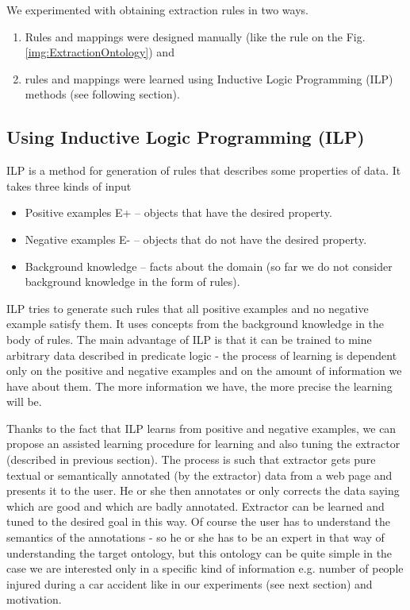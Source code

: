 \documentclass{sig-alternate}
\begin{document}
We experimented with obtaining extraction rules in two ways.
\begin{enumerate}
\item Rules and mappings were designed manually (like the rule on the Fig. \ref{img:ExtractionOntology}) and 
\item rules and mappings were learned using Inductive Logic Programming (ILP) methods (see following section).
\end{enumerate}


\subsection{Using Inductive Logic Programming (ILP)}
ILP is a method for generation of rules that describes some properties of data. It takes three kinds of input
\begin{itemize}
	\item Positive examples E+ -- objects that have the desired property.
	\item Negative examples E- -- objects that do not have the desired property.
	\item Background knowledge -- facts about the domain (so far we do not consider background knowledge in the form of rules).
\end{itemize}

ILP tries to generate such rules that all positive examples and no negative example satisfy them. It uses concepts from the background knowledge in the body of rules.
The main advantage of ILP is that it can be trained to mine arbitrary data described in predicate logic - the process of learning is dependent only on the positive and negative examples and on the amount of information we have about them. The more information we have, the more precise the learning will be. 

Thanks to the fact that ILP learns from positive and negative examples, we can propose an assisted learning procedure for learning and also tuning the extractor (described in previous section). The process is such that extractor gets pure textual or semantically annotated (by the extractor) data from a web page and presents it to the user. He or she then annotates or only corrects the data saying which are good and which are badly annotated. Extractor can be learned and tuned to the desired goal in this way. Of course the user has to understand the semantics of the annotations - so he or she has to be an expert in that way of understanding the target ontology, but this ontology can be quite simple in the case we are interested only in a specific kind of information e.g. number of people injured during a car accident like in our experiments (see next section) and motivation. 
\end{document}
